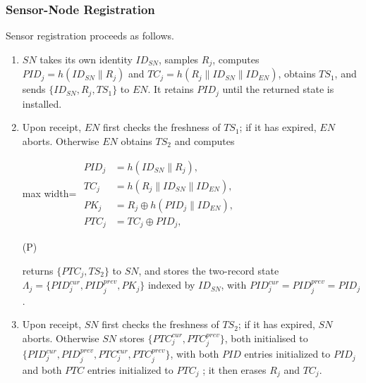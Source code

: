 \documentclass[cmc,article,submit,moreauthors,pdftex]{Definitions/tsp}
\newcommand{\cc}{\mathbin{\|}}
\newcounter{protoeq} %
\newenvironment{ceq}{%
  \refstepcounter{protoeq}%
  \par\vspace{-3pt}\setlength{\topsep}{0pt}\setlength{\partopsep}{0pt}\begin{center}%
}{%
  \hspace{0.45em}\textup{(P\theprotoeq)}%
  \end{center}\vspace{-3pt}%
} %
\providecommand{\DIFadd}[1]{{\protect\color{blue} \sf #1}} %
\providecommand{\DIFdel}[1]{{\protect\color{red} \scriptsize #1}} %
\providecommand{\DIFaddbegin}{} %
\providecommand{\DIFaddend}{} %
\providecommand{\DIFdelbegin}{} %
\providecommand{\DIFdelend}{} %
\begin{document}
\subsubsection{Sensor-Node Registration}

Sensor registration proceeds as follows.

\begin{enumerate}
\item $SN$ takes its own identity $ID_{SN}$, samples $R_j$, \DIFaddbegin \DIFadd{computes $PID_j=h(ID_{SN}\cc R_j)$ and $TC_j=h(R_j\cc ID_{SN}\cc ID_{EN})$, }\DIFaddend obtains $TS_1$, and sends $\{ID_{SN}, R_j, TS_1\}$ to $EN$. \DIFaddbegin \DIFadd{It retains $PID_j$ until the returned state is installed.
}\DIFaddend \item Upon receipt, $EN$ first checks the freshness of $TS_1$; if it has expired, $EN$ aborts. Otherwise $EN$ obtains $TS_2$ and computes

\DIFdelbegin %
\DIFdelend \DIFaddbegin \begin{ceq}
\DIFaddend \begin{adjustbox}{max width=\columnwidth}
$\displaystyle\begin{aligned}
PID_j &= h(ID_{SN} \cc R_j),\\
TC_j &= h(R_j \cc ID_{SN} \cc ID_{EN}),\\
PK_j &= R_j \oplus h(PID_j \cc ID_{EN}),\\
PTC_j &= TC_j \oplus PID_j,
\end{aligned}$
\end{adjustbox}
\DIFdelbegin %
\DIFdelend \DIFaddbegin \end{ceq}
\DIFaddend 

returns $\{PTC_j, TS_2\}$ to $SN$, and stores the two-record state $\Lambda_j=\{PID_j^{cur}, PID_j^{prev}, PK_j\}$ indexed by $ID_{SN}$, with $PID_j^{cur}=PID_j^{prev}=PID_j$.

\item Upon receipt, $SN$ first checks the freshness of $TS_2$; if it has expired, $SN$ aborts. Otherwise $SN$ stores \DIFdelbegin \DIFdel{$\{PTC_j^{cur}, PTC_j^{prev}\}$, both initialised to }\DIFdelend \DIFaddbegin \DIFadd{$\{PID_j^{cur},PID_j^{prev},PTC_j^{cur},PTC_j^{prev}\}$, with both $PID$ entries initialized to $PID_j$ and both $PTC$ entries initialized to }\DIFaddend $PTC_j$\DIFaddbegin \DIFadd{; it then erases $R_j$ and $TC_j$}\DIFaddend .
\end{enumerate}
\end{document}
